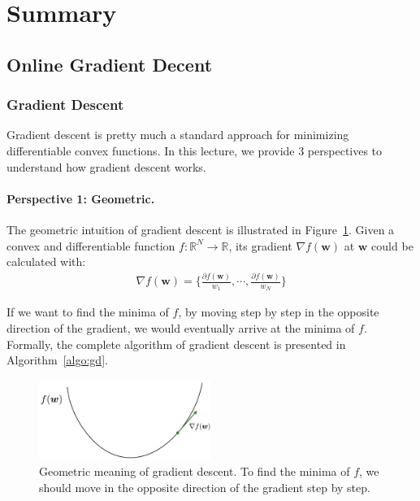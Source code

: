 \documentclass[11pt]{article}
\newcommand{\bw}{\boldsymbol{w}}
\begin{document}
\section{Summary}

\subsection{Online Gradient Decent}
\subsubsection{Gradient Descent}

Gradient descent is pretty much a standard approach for minimizing differentiable convex functions. In this lecture, we provide 3 perspectives to understand how gradient descent works.

\paragraph{Perspective 1: Geometric.}
The geometric intuition of gradient descent is illustrated in Figure~\ref{fig:GD_geometric}. Given a convex and differentiable function $f:\mathbb{R}^N \rightarrow \mathbb{R}$, its gradient $\nabla f(\bw)$ at $\bw$ could be calculated with:
\begin{equation*}
\begin{split}
\nabla f(\bw) = \Bigg\{ \frac{\partial f(\bw)}{w_1}, \cdots, \frac{\partial f(\bw)}{w_N} \Bigg\}
\end{split}
\end{equation*}

If we want to find the minima of $f$, by moving step by step in the opposite direction of the gradient, we would eventually arrive at the minima of $f$. Formally, the complete algorithm of gradient descent is presented in Algorithm~\ref{algo:gd}.

\begin{figure}[H]
    \centering
    \includegraphics[width=0.5\textwidth]{Img/GD_geometric.png}
    \caption{Geometric meaning of gradient descent. To find the minima of $f$, we should move in the opposite direction of the gradient step by step.}
    \label{fig:GD_geometric}
\end{figure}
\end{document}
